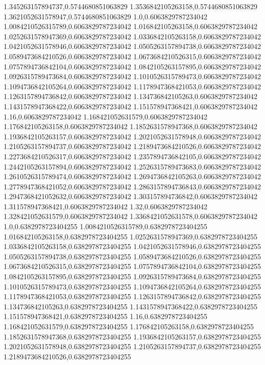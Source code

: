 1.345263157894737,0.5744680851063829
1.3536842105263158,0.5744680851063829
1.3621052631578947,0.5744680851063829
1.0,0.6063829787234042
1.0084210526315789,0.6063829787234042
1.016842105263158,0.6063829787234042
1.0252631578947369,0.6063829787234042
1.0336842105263158,0.6063829787234042
1.0421052631578946,0.6063829787234042
1.0505263157894738,0.6063829787234042
1.0589473684210526,0.6063829787234042
1.0673684210526315,0.6063829787234042
1.0757894736842104,0.6063829787234042
1.0842105263157895,0.6063829787234042
1.0926315789473684,0.6063829787234042
1.1010526315789473,0.6063829787234042
1.1094736842105264,0.6063829787234042
1.1178947368421053,0.6063829787234042
1.1263157894736842,0.6063829787234042
1.134736842105263,0.6063829787234042
1.1431578947368422,0.6063829787234042
1.151578947368421,0.6063829787234042
1.16,0.6063829787234042
1.168421052631579,0.6063829787234042
1.176842105263158,0.6063829787234042
1.1852631578947368,0.6063829787234042
1.1936842105263157,0.6063829787234042
1.2021052631578948,0.6063829787234042
1.2105263157894737,0.6063829787234042
1.2189473684210526,0.6063829787234042
1.2273684210526317,0.6063829787234042
1.2357894736842105,0.6063829787234042
1.2442105263157894,0.6063829787234042
1.2526315789473683,0.6063829787234042
1.2610526315789474,0.6063829787234042
1.2694736842105263,0.6063829787234042
1.2778947368421052,0.6063829787234042
1.2863157894736843,0.6063829787234042
1.2947368421052632,0.6063829787234042
1.303157894736842,0.6063829787234042
1.311578947368421,0.6063829787234042
1.32,0.6063829787234042
1.328421052631579,0.6063829787234042
1.3368421052631578,0.6063829787234042
1.0,0.6382978723404255
1.0084210526315789,0.6382978723404255
1.016842105263158,0.6382978723404255
1.0252631578947369,0.6382978723404255
1.0336842105263158,0.6382978723404255
1.0421052631578946,0.6382978723404255
1.0505263157894738,0.6382978723404255
1.0589473684210526,0.6382978723404255
1.0673684210526315,0.6382978723404255
1.0757894736842104,0.6382978723404255
1.0842105263157895,0.6382978723404255
1.0926315789473684,0.6382978723404255
1.1010526315789473,0.6382978723404255
1.1094736842105264,0.6382978723404255
1.1178947368421053,0.6382978723404255
1.1263157894736842,0.6382978723404255
1.134736842105263,0.6382978723404255
1.1431578947368422,0.6382978723404255
1.151578947368421,0.6382978723404255
1.16,0.6382978723404255
1.168421052631579,0.6382978723404255
1.176842105263158,0.6382978723404255
1.1852631578947368,0.6382978723404255
1.1936842105263157,0.6382978723404255
1.2021052631578948,0.6382978723404255
1.2105263157894737,0.6382978723404255
1.2189473684210526,0.6382978723404255

